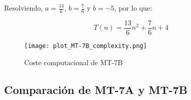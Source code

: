 Resolviendo, $a=\frac{13}{6}$, $b=\frac{7}{6}$ y $b=-5$, por lo que:

\begin{equation}
    T(n) = \frac{13}{6}n^2 + \frac{7}{6}n + 4
\end{equation}

\begin{figure}[h]
    \centering
    \texttt{[image: plot\_MT-7B\_complexity.png]}
    \caption{ Coste computacional de MT-7B}
\end{figure}





\subsection{Comparación de MT-7A y MT-7B}